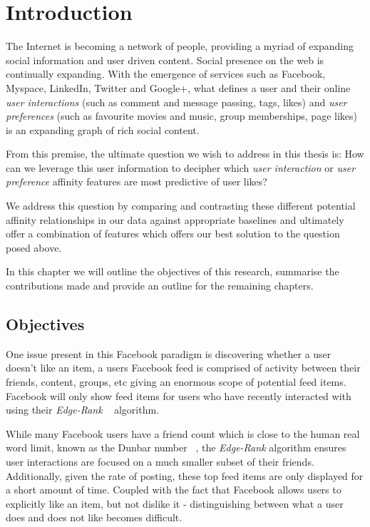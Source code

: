 
\chapter{Introduction}
\label{cha:intro}

The Internet is becoming a network of people, providing a myriad of expanding social information and user driven content. 
Social presence on the web is continually expanding. With the emergence of services such as Facebook, Myspace, LinkedIn, Twitter 
and Google+, what defines a user and their online \emph{user interactions} (such as comment and message passing, tags, likes) and \emph{user preferences} 
(such as favourite movies and music, group memberships, page likes) is an expanding graph of rich social content. 

From this premise, the ultimate question we wish to address in this thesis is: 
How can we leverage this user information to decipher which \emph{user interaction} or \emph{user preference} affinity features 
are most predictive of user likes? 

We address this question by comparing and contrasting these different potential affinity relationships in our data against appropriate 
baselines and ultimately offer a combination of features which offers our best solution to the question posed above.

In this chapter we will outline the objectives of this research, summarise the contributions made and provide an outline for the remaining
chapters.

\section{Objectives}
\label{sec:objectives}

One issue present in this Facebook paradigm is discovering whether a user doesn't like an item, a users Facebook feed is comprised of 
activity between their friends, content, groups, etc giving an enormous scope of potential feed items. Facebook will only show feed 
items for users who have recently interacted with using their \emph{Edge-Rank} ~\cite{edge} algorithm. 

While many Facebook users have a friend count which is close to the human real word limit, known as the Dunbar number 
~\cite{hill2003social}, the \emph{Edge-Rank} algorithm ensures user interactions are focused on a much smaller subset of their friends.
Additionally, given the rate of posting, these top feed items are only displayed for a short amount of time. Coupled 
with the fact that Facebook allows users to explicitly like an item, but not dislike it - distinguishing between what 
a user does and does not like becomes difficult.

